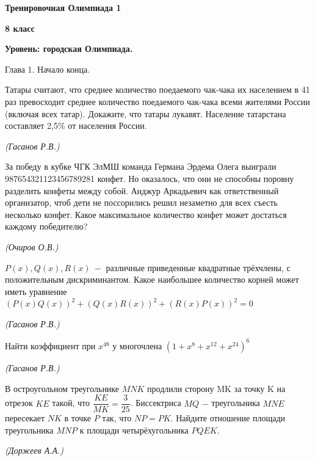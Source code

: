\centerline{\Huge \bf  Тренировочная Олимпиада 1}
\centerline{\Huge \bf 8 класс}
\centerline{\Huge \bf Уровень: городская Олимпиада.}


\begin{flushright}
    \scriptsize{Глава 1. Начало конца.}
\end{flushright}

Татары считают, что среднее количество поедаемого чак-чака их населением в 41 раз превосходит среднее количество поедаемого чак-чака всеми жителями России (включая всех татар). Докажите, что татары лукавят. Население татарстана составляет 2,5\% от населения России.
\begin{flushright}
    \textit{\small{(Гасанов Р.В.)}}
\end{flushright}

 За победу в кубке ЧГК ЭлМШ команда Германа Эрдема Олега выиграли \\987654321123456789281 конфет. Но оказалось, что они не способны поровну разделить конфеты между собой. Анджур Аркадьевич как ответственный организатор, чтоб дети не поссорились решил незаметно для всех съесть несколько конфет. Какое максимальное количество конфет может достаться каждому победителю?
\begin{flushright}
    \textit{\small{(Очиров О.В.)}}
\end{flushright}

 $P(x), Q(x), R(x) \ -$ различные приведенные квадратные трёхчлены, с положительным дискриминантом. Какое наибольшее количество корней может иметь уравнение $(P(x)Q(x))^2+(Q(x)R(x))^2+(R(x)P(x))^2 = 0$
\begin{flushright}
    \textit{\small{(Гасанов Р.В.)}}
\end{flushright}

  Найти коэффициент при $x^{48}$ у многочлена $(1 + x^8 + x^{12} + x^{24})^6$

\begin{flushright}
    \textit{\small{(Гасанов Р.В.)}}
\end{flushright}


 В остроугольном треугольнике $MNK$ продлили сторону MK за точку K на отрезок $KE$ такой, что $\dfrac{KE}{MK} = \dfrac{3}{25}$. Биссектриса $MQ$ $-$ треугольника $MNE$ пересекает $NK$ в точке $P$ так, что $NP = PK$. Найдите отношение площади треугольника $MNP$ к площади четырёхугольника $PQEK$.

\begin{flushright}
    \textit{\small{(Доржеев А.А.)}}
\end{flushright}